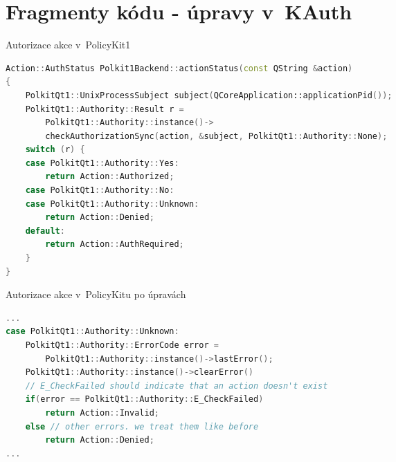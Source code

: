 \chapter{Fragmenty kódu - úpravy v~KAuth}
\begin{mylisting}
\caption{Autorizace akce v~PolicyKit1}
\label{kauth-oldmethod}
\begin{lstlisting}[language=C++]
Action::AuthStatus Polkit1Backend::actionStatus(const QString &action)
{
    PolkitQt1::UnixProcessSubject subject(QCoreApplication::applicationPid());
    PolkitQt1::Authority::Result r =
        PolkitQt1::Authority::instance()->
        checkAuthorizationSync(action, &subject, PolkitQt1::Authority::None);
    switch (r) {
    case PolkitQt1::Authority::Yes:
        return Action::Authorized;
    case PolkitQt1::Authority::No:
    case PolkitQt1::Authority::Unknown:
        return Action::Denied;
    default:
        return Action::AuthRequired;
    }
}
\end{lstlisting}
\end{mylisting}
\begin{mylisting}
\caption{Autorizace akce v~PolicyKitu po úpravách}
\label{kauth-newmethod}
\begin{lstlisting}[language=C++]
...
case PolkitQt1::Authority::Unknown:
    PolkitQt1::Authority::ErrorCode error =
        PolkitQt1::Authority::instance()->lastError();
    PolkitQt1::Authority::instance()->clearError()
    // E_CheckFailed should indicate that an action doesn't exist
    if(error == PolkitQt1::Authority::E_CheckFailed)
        return Action::Invalid;
    else // other errors. we treat them like before
        return Action::Denied;
...
\end{lstlisting}
\end{mylisting}